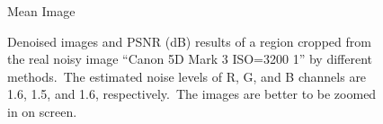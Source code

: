 \begin{figure}
{\begin{minipage}[t]{0.19\textwidth}
{\footnotesize Mean Image }
\end{minipage}
}
    \caption{Denoised images and PSNR (dB) results of a region cropped from the real noisy image ``Canon 5D Mark 3 ISO=3200 1'' \cite{crosschannel2016} by different methods.\ The estimated noise levels of R, G, and B channels are 1.6, 1.5, and 1.6, respectively.\ The images are better to be zoomed in on screen.}
    \label{fig4-13}
\end{figure}



\begin{figure}
    \centering
{}
\end{figure}
